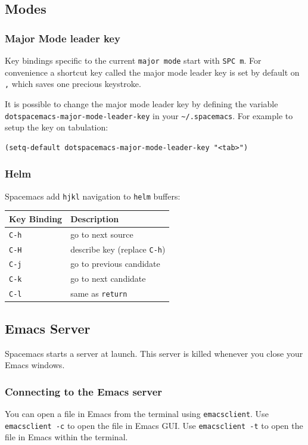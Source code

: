 \documentclass[11pt]{article}
\begin{document}
\subsection{Modes}
\label{sec:org81c9fa7}
\subsubsection{Major Mode leader key}
\label{sec:org0a8edc9}
Key bindings specific to the current \texttt{major mode} start with \texttt{SPC m}. For
convenience a shortcut key called the major mode leader key is set by default on
\texttt{​,​} which saves one precious keystroke.

It is possible to change the major mode leader key by defining the variable
\texttt{dotspacemacs-major-mode-leader-key} in your \texttt{\textasciitilde{}/.spacemacs}. For example to
setup the key on tabulation:

\begin{verbatim}
(setq-default dotspacemacs-major-mode-leader-key "<tab>")
\end{verbatim}

\subsubsection{Helm}
\label{sec:orgf2a1c66}
Spacemacs add \texttt{hjkl} navigation to \texttt{helm} buffers:

\begin{center}
\begin{tabular}{ll}
Key Binding & Description\\
\hline
\texttt{C-h} & go to next source\\
\texttt{C-H} & describe key (replace \texttt{C-h})\\
\texttt{C-j} & go to previous candidate\\
\texttt{C-k} & go to next candidate\\
\texttt{C-l} & same as \texttt{return}\\
\end{tabular}
\end{center}

\subsection{Emacs Server}
\label{sec:org5ba5e0e}
Spacemacs starts a server at launch. This server is killed whenever you close
your Emacs windows.

\subsubsection{Connecting to the Emacs server}
\label{sec:org3ad3058}
You can open a file in Emacs from the terminal using \texttt{emacsclient}. Use
\texttt{emacsclient -c} to open the file in Emacs GUI. Use \texttt{emacsclient -t} to open the
file in Emacs within the terminal.
\end{document}
